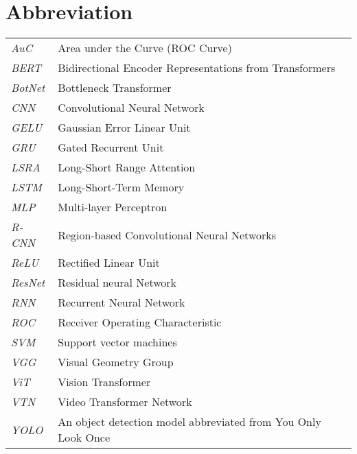 \newpage
\makeatletter
\let\mcnewpage=\newpage
\newcommand{\TrickSupertabularIntoMulticols}{%
  \renewcommand\newpage{%
    \if@firstcolumn
      \hrule width\linewidth height0pt
      \columnbreak
    \else
      \mcnewpage
    \fi
  }%
}
\makeatother
\chapter{Abbreviation}
\begin{changemargin}{-0.5cm}{0cm}
\begin{multicols*}{2}
\TrickSupertabularIntoMulticols
\begin{supertabular}{>{\em}lp{6.2cm}}
AuC & Area under the Curve (ROC Curve) \\ [.5em]
BERT & Bidirectional Encoder Representations from Transformers \\ [.5em]
BotNet & Bottleneck Transformer \\ [.5em]
CNN & Convolutional Neural Network \\ [.5em]
GELU & Gaussian Error Linear Unit \\ [.5em]
GRU & Gated Recurrent Unit \\ [.5em]
LSRA & Long-Short Range Attention \\ [.5em]
LSTM & Long-Short-Term Memory \\ [.5em]
MLP & Multi-layer Perceptron \\ [.5em]
R-CNN & Region-based Convolutional Neural Networks \\ [.5em]
ReLU & Rectified Linear Unit \\ [.5em]
ResNet & Residual neural Network \\ [.5em]
RNN & Recurrent Neural Network \\ [.5em]
ROC & Receiver Operating Characteristic \\ [.5em]
SVM & Support vector machines \\ [.5em]
VGG & Visual Geometry Group \\ [.5em]
ViT & Vision Transformer \\ [.5em]
VTN & Video Transformer Network \\ [.5em]
YOLO & An object detection model abbreviated from You Only Look Once \\ [.5em]
\end{supertabular}
\end{multicols*}
\end{changemargin}